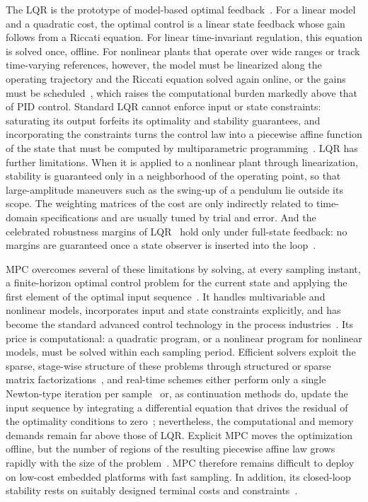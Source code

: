 The LQR is the prototype of model-based optimal
feedback~\citep{kalman1960contributions,anderson1990optimal}.
For a linear model and a quadratic cost, the optimal control is a linear state feedback whose
gain follows from a Riccati equation.
For linear time-invariant regulation, this equation is solved once, offline.
For nonlinear plants that operate over wide ranges or track time-varying references, however,
the model must be linearized along the operating trajectory and the Riccati equation solved
again online, or the gains must be scheduled~\citep{rugh2000research}, which raises the
computational burden markedly above that of PID control.
Standard LQR cannot enforce input or state constraints: saturating its output forfeits its
optimality and stability guarantees, and incorporating the constraints turns the control law
into a piecewise affine function of the state that must be computed by multiparametric
programming~\citep{bemporad2002explicit}.
LQR has further limitations.
When it is applied to a nonlinear plant through linearization, stability is guaranteed only in
a neighborhood of the operating point, so that large-amplitude maneuvers such as the swing-up
of a pendulum lie outside its scope.
The weighting matrices of the cost are only indirectly related to time-domain specifications
and are usually tuned by trial and error.
And the celebrated robustness margins of LQR~\citep{safonov1977gain} hold only under full-state
feedback: no margins are guaranteed once a state observer is inserted into the
loop~\citep{doyle1978guaranteed}.

MPC overcomes several of these limitations by solving, at every sampling instant, a
finite-horizon optimal control problem for the current state and applying the first element of
the optimal input sequence~\citep{mayne2000constrained}.
It handles multivariable and nonlinear models, incorporates input and state constraints
explicitly, and has become the standard advanced control technology in the process
industries~\citep{qin2003survey}.
Its price is computational: a quadratic program, or a nonlinear program for nonlinear models,
must be solved within each sampling period.
Efficient solvers exploit the sparse, stage-wise structure of these problems through structured
or sparse matrix factorizations~\citep{rao1998application,wang2010fast,stellato2020osqp}, and
real-time schemes either perform only a single Newton-type iteration per
sample~\citep{diehl2005realtime,verschueren2022acados} or, as continuation methods do, update
the input sequence by integrating a differential equation that drives the residual of the
optimality conditions to zero~\citep{ohtsuka2004continuation}; nevertheless, the computational
and memory demands remain far above those of LQR.
Explicit MPC moves the optimization offline, but the number of regions of the resulting
piecewise affine law grows rapidly with the size of the problem~\citep{bemporad2002explicit}.
MPC therefore remains difficult to deploy on low-cost embedded platforms with fast sampling.
In addition, its closed-loop stability rests on suitably designed terminal costs and
constraints~\citep{mayne2000constrained}.


